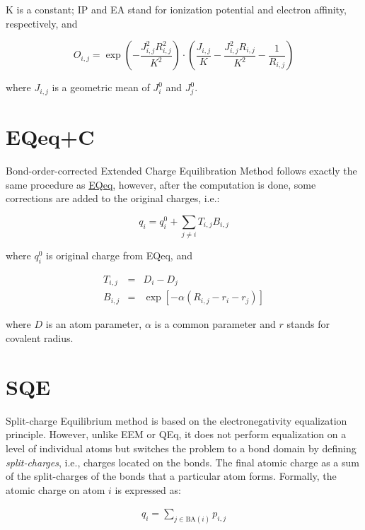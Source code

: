 \documentclass[oneside]{memoir}
\newcommand\ddfrac[2]{\frac{\displaystyle #1}{\displaystyle #2}}
\begin{document}
K is a constant; IP and EA stand for ionization potential and electron affinity, respectively, and

\begin{equation}
\label{eq:eqeq_overlap}
O_{i, j} = \exp{\left(-\ddfrac{J_{i, j}^2R_{i, j}^2}{K^2}\right)}\cdot\left(\ddfrac{J_{i, j}}{K} - \ddfrac{J_{i, j}^2R_{i, j}}{K^2} - \ddfrac{1}{R_{i, j}}\right)
\end{equation}

where $J_{i, j}$ is a geometric mean of $J_i^0$ and $J_j^0$.

\section*{EQeq+C}
Bond-order-corrected Extended Charge Equilibration Method \cite{MartinNoble2015} follows exactly the same procedure as \hyperref[sec:methods_eqeq]{EQeq}, however, after the computation is done, some corrections are added to the original charges, i.e.:

\begin{equation}
\label{eq:eqeqc_main}
q_i = q_i^0 + \sum_{j \neq i} T_{i, j}B_{i, j}
\end{equation}

where $q_i^0$ is original charge from EQeq, and

\begin{eqnarray}
\label{eq:eqeqc_terms}
T_{i, j} &=& D_i - D_j\\ 
B_{i, j} &=& \exp\left[-\alpha\left(R_{i, j} - r_i - r_j\right)\right]
\end{eqnarray}

where $D$ is an atom parameter, $\alpha$ is a common parameter and $r$ stands for covalent radius.

\section*{SQE}


Split-charge Equilibrium method \cite{Nistor2006} is based on the electronegativity equalization principle. However, unlike EEM or QEq, it does not perform equalization on a level of individual atoms but switches the problem to a bond domain by defining \textit{split-charges}, i.e., charges located on the bonds. The final atomic charge as a sum of the split-charges of the bonds that a particular atom forms. Formally, the atomic charge on atom $i$ is expressed as:

\begin{gather}
    \label{eq:sqe_sum}
    q_i = \sum_{j \in \mathrm{BA}(i)} p_{i, j}
\end{gather}
\end{document}
